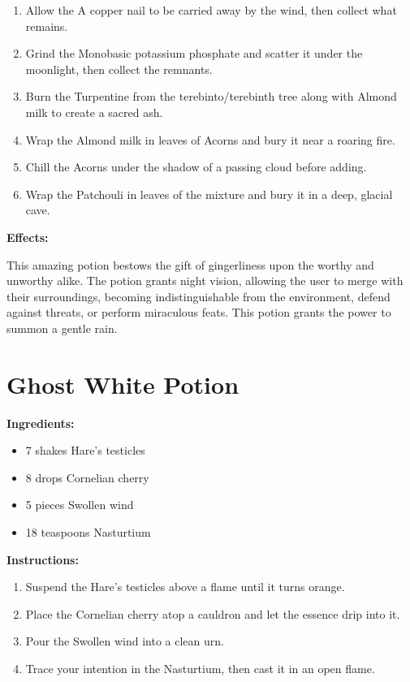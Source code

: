 \documentclass{article}
\begin{document}
\begin{enumerate}
  \item Allow the A copper nail to be carried away by the wind, then collect what remains.
  \item Grind the Monobasic potassium phosphate and scatter it under the moonlight, then collect the remnants.
  \item Burn the Turpentine from the terebinto/terebinth tree along with Almond milk to create a sacred ash.
  \item Wrap the Almond milk in leaves of Acorns and bury it near a roaring fire.
  \item Chill the Acorns under the shadow of a passing cloud before adding.
  \item Wrap the Patchouli in leaves of the mixture and bury it in a deep, glacial cave.
\end{enumerate}

\textbf{Effects:}

This amazing potion bestows the gift of gingerliness upon the worthy and unworthy alike. The potion grants night vision, allowing the user to merge with their surroundings, becoming indistinguishable from the environment, defend against threats, or perform miraculous feats. This potion grants the power to summon a gentle rain.

\newpage
\section*{Ghost White Potion}

\textbf{Ingredients:}

\begin{itemize}
  \item 7 shakes Hare's testicles
  \item 8 drops Cornelian cherry
  \item 5 pieces Swollen wind
  \item 18 teaspoons Nasturtium
\end{itemize}

\textbf{Instructions:}

\begin{enumerate}
  \item Suspend the Hare's testicles above a flame until it turns orange.
  \item Place the Cornelian cherry atop a cauldron and let the essence drip into it.
  \item Pour the Swollen wind into a clean urn.
  \item Trace your intention in the Nasturtium, then cast it in an open flame.
\end{enumerate}
\end{document}
